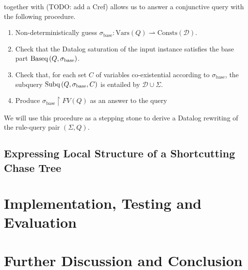 \documentclass[12pt]{report}
\theoremstyle{plain}
\theoremstyle{definition}
\def\Vars{{\mathrm{Vars}}}
\def\Consts{{\mathrm{Consts}}}
\newcommand{\Subq}[3]{\ensuremath{\normalfont{\textrm{Subq}} \left( #1, #2, #3 \right)}}
\newcommand{\Baseq}[2]{\ensuremath{\normalfont{\textrm{Baseq}} \left( #1, #2 \right)}}
\begin{document}
 together with (TODO: add a Cref) allows us to answer a conjunctive query with the following procedure.

\begin{enumerate}
  \item Non-deterministically guess $\sigma_\mathrm{base}: \Vars(Q) \rightharpoonup \Consts(\mathcal{D})$.
  \item Check that the Datalog saturation of the input instance satisfies the base part $\Baseq{Q}{\sigma_\mathrm{base}}$.
  \item Check that, for each set $C$ of variables co-existential according to $\sigma_\mathrm{base}$, the subquery $\Subq{Q}{\sigma_\mathrm{base}}{C}$ is entailed by $\mathcal{D} \cup \Sigma$.
  \item Produce $\sigma_\mathrm{base} \upharpoonright FV(Q)$ as an answer to the query
\end{enumerate}

We will use this procedure as a stepping stone to derive a Datalog rewriting of the rule-query pair $(\Sigma, Q)$.

\section{Expressing Local Structure of a Shortcutting Chase Tree}



\newpage
\chapter{Implementation, Testing and Evaluation}

\newpage
\chapter{Further Discussion and Conclusion}

\printbibliography
\end{document}
